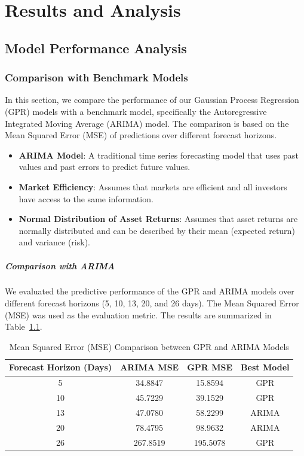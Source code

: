 
\chapter{Results and Analysis}\label{chapter:results and analysis}
\section{Model Performance Analysis}

\subsection{Comparison with Benchmark Models}

In this section, we compare the performance of our Gaussian Process Regression (GPR) models with a benchmark model, specifically the Autoregressive Integrated Moving Average (ARIMA) model. The comparison is based on the Mean Squared Error (MSE) of predictions over different forecast horizons.

\begin{itemize}
    \item \textbf{ARIMA Model}: A traditional time series forecasting model that uses past values and past errors to predict future values.
    \item \textbf{Market Efficiency}: Assumes that markets are efficient and all investors have access to the same information.
    \item \textbf{Normal Distribution of Asset Returns}: Assumes that asset returns are normally distributed and can be described by their mean (expected return) and variance (risk).
\end{itemize}

\paragraph{Comparison with ARIMA}

We evaluated the predictive performance of the GPR and ARIMA models over different forecast horizons (5, 10, 13, 20, and 26 days). The Mean Squared Error (MSE) was used as the evaluation metric. The results are summarized in Table~\ref{tab:mse_comparison}.

\begin{table}[htbp]
\centering
\caption{Mean Squared Error (MSE) Comparison between GPR and ARIMA Models}
\label{tab:mse_comparison}
\begin{tabular}{cccc}
\toprule
\textbf{Forecast Horizon (Days)} & \textbf{ARIMA MSE} & \textbf{GPR MSE} & \textbf{Best Model} \\
\midrule
5  & 34.8847 & 15.8594 & GPR \\
10 & 45.7229 & 39.1529 & GPR \\
13 & 47.0780 & 58.2299 & ARIMA \\
20 & 78.4795 & 98.9632 & ARIMA \\
26 & 267.8519 & 195.5078 & GPR \\
\bottomrule
\end{tabular}
\end{table}

